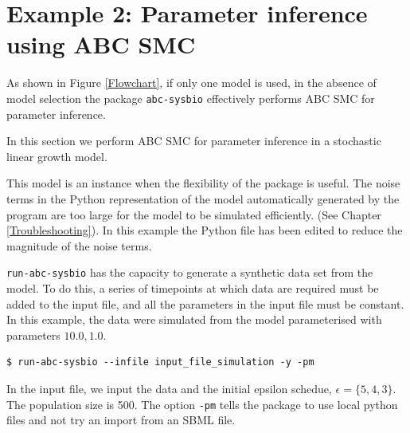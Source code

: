 \documentclass[a4paper]{report}
\begin{document}
\newpage
\newpage

\section{Example 2: Parameter inference using ABC SMC}
As shown in Figure \ref{Flowchart}, if only one model is used, in the absence of model selection the package \verb$abc-sysbio$ effectively performs ABC SMC for parameter inference.

In this section we perform ABC SMC for parameter inference in a stochastic linear growth model. 

This model is an instance when the flexibility of the package is useful. The noise terms in the Python representation of the model automatically generated by the program are too large for the model to be simulated efficiently. (See Chapter \ref{Troubleshooting}). In this example the Python file has been edited to reduce the magnitude of the noise terms. 

\verb$run-abc-sysbio$ has the capacity to generate a synthetic data set from the model. To do this, a series of timepoints at which data are required must be added to the input file, and all the parameters in the input file must be constant. In this example, the data were simulated from the model parameterised with parameters $10.0, 1.0$.
\begin{verbatim}
$ run-abc-sysbio --infile input_file_simulation -y -pm
\end{verbatim}
In the input file, we input the data and the initial epsilon schedue, $\epsilon = \{5, 4, 3\}$. The population size is 500. The option \verb$-pm$ tells the package to use local python files and not try an import from an SBML file.
\end{document}
